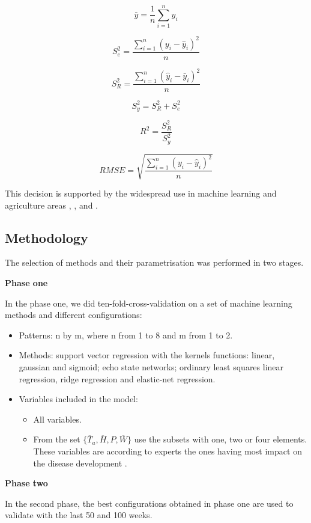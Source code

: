 \documentclass[review,authoryear,english]{elsarticle}
\begin{document}
$$ \bar{y} = \frac{1}{n} \sum_{i=1}^{n} y_i $$

$$ S_e^2 = \frac{\sum_{i=1}^{n} {(y_i-\hat{y}_i)}^2 }{n}$$

$$ S_R^2 = \frac{\sum_{i=1}^{n} {(\hat{y}_i-\bar{y}_i)}^2 }{n}$$

$$ S_y^2 = S_R^2 + S_e^2$$

$$ R^2 = \frac{S_R^2}{S_y^2}$$

$$ RMSE = \sqrt{\frac{\sum_{i=1}^{n} {(y_i-\hat{y}_i)}^2 }{n}}$$
	
This decision is supported by the widespread use in machine learning and agriculture areas \citep{Soares2014}, \citep{Soares2013}, \citep{Ibrahim2014} and \citep{Demir2014}.  

\subsection{Methodology}
The selection of methods and their parametrisation was performed in two stages.

{\bf Phase one } 

In the phase one, we did ten-fold-cross-validation on a set of  machine learning methods and different configurations:

\begin{itemize}
\item 	Patterns: n by m, where n from 1 to 8 and m from 1 to 2.

\item Methods: support vector regression with the kernels functions: linear, gaussian and sigmoid; echo state networks; ordinary least squares linear regression, ridge regression and elastic-net regression.

\item Variables included in the model:
\begin{itemize}
\item All variables.
\item From the set $\{ \overline{T}_{a} , \overline{H}, P , \overline{W}  \}$ use the subsets with one, two or four elements. These variables are according to experts the ones having most impact on the disease development \citep{MarinVargas1995}.
\end{itemize}

\end{itemize}

{\bf Phase two }	

In the second phase, the best configurations obtained in phase one are used to validate with the last 50 and 100 weeks. 
\end{document}
